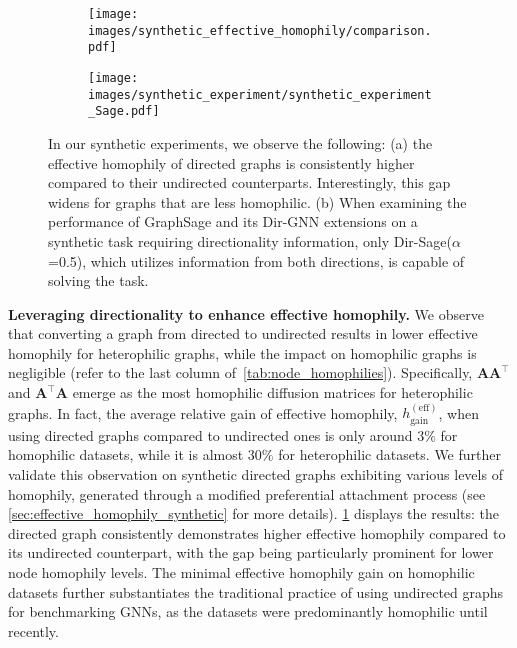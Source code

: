 \documentclass{article}
\newcommand\oursacro{Dir-GNN}
\newcommand\effhom{h^{(\text{eff})}}
\theoremstyle{plain}
\theoremstyle{definition}
\theoremstyle{remark}
\begin{document}
 
\begin{figure}[t!]
\centering
\vspace{-7mm}
\begin{subfigure}[b]{0.44\textwidth}
     \centering
     \texttt{[image: images/synthetic\_effective\_homophily/comparison.pdf]}
     \caption{}
     \label{fig:synthetic_effective_homophily}
\end{subfigure}
\hspace{5mm}
\begin{subfigure}[b]{0.44\textwidth}
     \centering
     \texttt{[image: images/synthetic\_experiment/synthetic\_experiment\_Sage.pdf]}
     \caption{}
    \label{fig:synthetic_task}
\end{subfigure}

\caption{In our synthetic experiments, we observe the following: (a) the effective homophily of directed graphs is consistently higher compared to their undirected counterparts. Interestingly, this gap widens for graphs that are less homophilic. (b) When examining the performance of GraphSage and its \oursacro{} extensions on a synthetic task requiring directionality information, only Dir-Sage($\alpha$=0.5), which utilizes information from both directions, is capable of solving the task.}
\label{fig:test1}
\end{figure}

\textbf{Leveraging directionality to enhance effective homophily.}
We observe that converting a graph from directed to undirected results in lower effective homophily for heterophilic graphs, while the impact on homophilic graphs is negligible (refer to the last column of~\cref{tab:node_homophilies}). Specifically, $\mathbf{A}\mathbf{A}^\top$ and $\mathbf{A}^\top\mathbf{A}$ emerge as the most homophilic diffusion matrices for heterophilic graphs. In fact, the average relative gain of effective homophily, $\effhom_\text{gain}$, when using directed graphs compared to undirected ones is only around $3\%$ for homophilic datasets, while it is almost $30\%$ for heterophilic datasets. We further validate this observation on synthetic directed graphs exhibiting various levels of homophily, generated through a modified preferential attachment process (see \cref{sec:effective_homophily_synthetic} for more details). \cref{fig:synthetic_effective_homophily} displays the results: the directed graph consistently demonstrates higher effective homophily compared to its undirected counterpart, with the gap being particularly prominent for lower node homophily levels. The minimal effective homophily gain on homophilic datasets further substantiates the traditional practice of using undirected graphs for benchmarking GNNs, as the datasets were predominantly homophilic until recently. 
\end{document}

